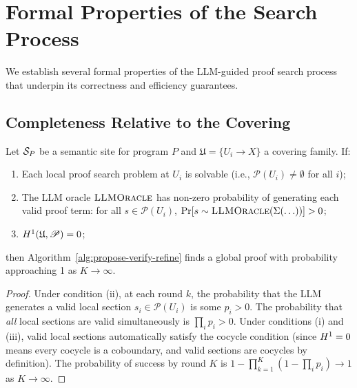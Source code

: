 \documentclass[11pt]{article}
\newcommand{\LLMOracle}{\textsc{LLMOracle}}
\newcommand{\PromptStrat}{\Sigma}
\newcommand{\ProofSheaf}{\mathscr{P}}
\begin{document}
\section{Formal Properties of the Search Process}\label{sec:formal-props}

We establish several formal properties of the LLM-guided proof search
process that underpin its correctness and efficiency guarantees.

\subsection{Completeness Relative to the Covering}\label{subsec:completeness}

\begin{theorem}\label{thm:completeness}
Let $\mathcal{S}_P$ be a semantic site for program $P$ and
$\mathfrak{U} = \{U_i \to X\}$ a covering family.  If:
\begin{enumerate}[label=(\roman*)]
  \item Each local proof search problem at $U_i$ is solvable (i.e.,
    $\ProofSheaf(U_i) \neq \emptyset$ for all $i$);
  \item The LLM oracle $\LLMOracle$ has non-zero probability of
    generating each valid proof term: for all $s \in \ProofSheaf(U_i)$,
    $\Pr[s \sim \LLMOracle(\PromptStrat(\ldots))] > 0$;
  \item $\Hcoh{1}(\mathfrak{U}, \ProofSheaf) = 0$;
\end{enumerate}
then Algorithm~\ref{alg:propose-verify-refine} finds a global proof
with probability approaching 1 as $K \to \infty$.
\end{theorem}

\begin{proof}
Under condition (ii), at each round $k$, the probability that the LLM
generates a valid local section $s_i \in \ProofSheaf(U_i)$ is some
$p_i > 0$.  The probability that \emph{all} local sections are valid
simultaneously is $\prod_i p_i > 0$.  Under conditions (i) and (iii),
valid local sections automatically satisfy the cocycle condition (since
$H^{1} = 0$ means every cocycle is a coboundary, and valid sections
are cocycles by definition).  The probability of success by round $K$
is $1 - \prod_{k=1}^{K}(1 - \prod_i p_i) \to 1$ as $K \to \infty$.
\end{proof}
\end{document}

